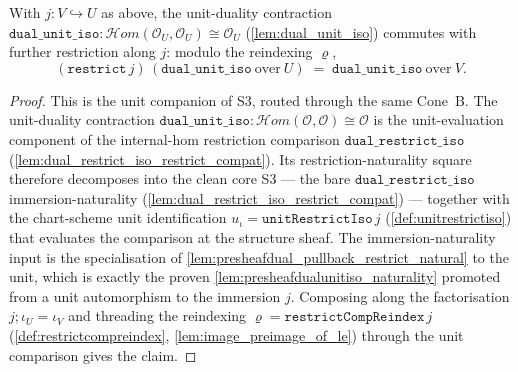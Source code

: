 \begin{lemma}


  \label{lem:dual_unit_iso_restrict_compat}
  With \(j : V \hookrightarrow U\) as above, the unit-duality contraction
  \(\mathtt{dual\_unit\_iso} : \mathcal{H}om(\mathcal{O}_U, \mathcal{O}_U) \cong \mathcal{O}_U\)
  (\cref{lem:dual_unit_iso}) commutes with further restriction along \(j\): modulo the reindexing
  \(\varrho\),
  \[
    (\mathtt{restrict}\,j)\,(\mathtt{dual\_unit\_iso}\ \text{over}\ U)
      \;=\; \mathtt{dual\_unit\_iso}\ \text{over}\ V.
  \]
\end{lemma}
\begin{proof}
  This is the unit companion of S3, routed through the same Cone~B. The unit-duality contraction
  \(\mathtt{dual\_unit\_iso} : \mathcal{H}om(\mathcal{O}, \mathcal{O}) \cong \mathcal{O}\) is the
  unit-evaluation component of the internal-hom restriction comparison
  \(\mathtt{dual\_restrict\_iso}\) (\cref{lem:dual_restrict_iso_restrict_compat}). Its
  restriction-naturality square therefore decomposes into the clean core S3 --- the bare
  \(\mathtt{dual\_restrict\_iso}\) immersion-naturality
  (\cref{lem:dual_restrict_iso_restrict_compat}) --- together with the chart-scheme unit
  identification \(u_\iota = \mathtt{unitRestrictIso}\,j\) (\cref{def:unitrestrictiso}) that
  evaluates the comparison at the structure sheaf. The immersion-naturality input is the
  specialisation of \cref{lem:presheafdual_pullback_restrict_natural} to the unit, which is exactly
  the proven \cref{lem:presheafdualunitiso_naturality} promoted from a unit automorphism to the
  immersion \(j\). Composing along the factorisation \(j \mathbin{;} \iota_U = \iota_V\) and threading
  the reindexing \(\varrho = \mathtt{restrictCompReindex}\,j\) (\cref{def:restrictcompreindex},
  \cref{lem:image_preimage_of_le}) through the unit comparison gives the claim.
\end{proof}

